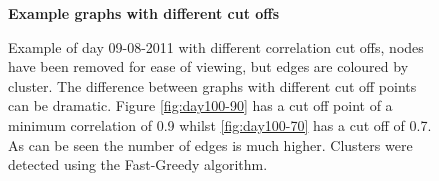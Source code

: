 \begin{figure}[ht]
\centering
\textbf{Example graphs with different cut offs}\par\medskip
{}

\caption[Example graphs with different cut offs]{Example of day 09-08-2011 with different correlation cut offs, nodes have been removed for ease of viewing, but edges are coloured by cluster. The difference between graphs with different cut off points can be dramatic. Figure \ref{fig:day100-90} has a cut off point of a minimum correlation of 0.9 whilst \ref{fig:day100-70} has a cut off of 0.7. As can be seen the number of edges is much higher. Clusters were detected using the Fast-Greedy algorithm.}
\label{fig:cutoff70vs90}
\end{figure}


